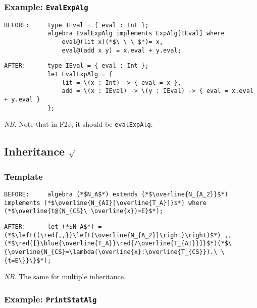 \documentclass{article}
\newcommand{\red}[1]{\textcolor{red}{#1}}
\newcommand{\blue}[1]{\textcolor{blue}{#1}}
\newcommand{\nb}{\textit{NB. }}
\begin{document}
\begin{spacing}{1.1}
\subsubsection{Example: \lstinline{EvalExpAlg}}

\begin{lstlisting}[numbers=none]
BEFORE:     type IEval = { eval : Int };
            algebra EvalExpAlg implements ExpAlg[IEval] where
                eval@(lit x)(*$\ \ \ $*)= x,
                eval@(add x y) = x.eval + y.eval;
\end{lstlisting}
\begin{lstlisting}[numbers=none]
AFTER:      type IEval = { eval : Int };
            let EvalExpAlg = {
                lit = \(x : Int) -> { eval = x },
                add = \(x : IEval) -> \(y : IEval) -> { eval = x.eval + y.eval }
            };
\end{lstlisting}

\nb Note that in F2J, it should be \lstinline{evalExpAlg}.

\subsection{Inheritance $\surd$}

\subsubsection{Template}

\begin{lstlisting}[numbers=none]
BEFORE:     algebra (*$N_A$*) extends (*$\overline{N_{A_2}}$*) implements (*$\overline{N_{AI}[\overline{T_A}]}$*) where (*$\overline{t@(N_{CS}\ \overline{x})=E}$*);
\end{lstlisting}
\begin{lstlisting}[numbers=none]
AFTER:      let (*$N_A$*) =  (*$\left((\red{,,})\left(\overline{N_{A_2}}\right)\right)$*) ,, (*$\red{[}\blue{\overline{T_A}}\red{/\overline{T_{AI}}]}$*)(*$\{\overline{N_{CS}=\lambda(\overline{x}:\overline{T_{CS}}).\ \{t=E\}}\}$*);
\end{lstlisting}

\nb The same for multiple inheritance.

\subsubsection{Example: \lstinline{PrintStatAlg}}


\end{spacing}
\end{document}
